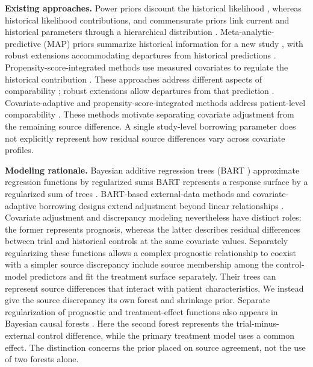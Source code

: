 \documentclass[11pt]{article}
\theoremstyle{remark}\newtheorem{remark}{Remark}[section]
\providecommand{\DIFaddtex}[1]{{\protect\color{blue} \sf #1}} %
\providecommand{\DIFdeltex}[1]{{\protect\color{red} \scriptsize #1}} %
\providecommand{\DIFaddbegin}{} %
\providecommand{\DIFaddend}{} %
\providecommand{\DIFdelbegin}{} %
\providecommand{\DIFdelend}{} %
\providecommand{\DIFadd}[1]{\texorpdfstring{\DIFaddtex{#1}}{#1}} %
\providecommand{\DIFdel}[1]{\texorpdfstring{\DIFdeltex{#1}}{}} %
\begin{document}
\DIFdelbegin %
\DIFdel{\textbf{Existing approaches.}
}\DIFdelend Power priors discount \DIFdelbegin \DIFdel{the historical likelihood , whereas }\DIFdelend \DIFaddbegin \DIFadd{historical likelihood contributions, and }\DIFaddend commensurate priors link current and historical parameters through a hierarchical distribution \citep{IbrahimChen2000,Hobbs2011,Hobbs2012}. Meta-analytic-predictive \DIFdelbegin \DIFdel{(MAP) }\DIFdelend priors summarize historical information for a new study\DIFdelbegin \DIFdel{, with robust extensions accommodating departures from historical predictions \citep{Neuenschwander2010MAP,Schmidli2014MAP}. Propensity-score-integrated methods use measured covariates to regulate the historical contribution \citep{Chen2020PSCL}. These approaches address different aspects of comparability }\DIFdelend \DIFaddbegin \DIFadd{; robust extensions allow departures from that prediction \citep{Neuenschwander2010MAP,Schmidli2014MAP}. Covariate-adaptive and propensity-score-integrated methods address patient-level comparability \citep{Jin2023CAHB,Chen2020PSCL}. These methods motivate separating covariate adjustment from the remaining source difference}\DIFaddend .
\DIFdelbegin \DIFdel{A single study-level borrowing parameter does not explicitly represent how residual source differences vary across covariate profiles.
}\DIFdelend 

\DIFdelbegin %
\DIFdel{\textbf{Modeling rationale.}
Bayesian additive regression trees (BART ) approximate regression functions by regularized sums }\DIFdelend \DIFaddbegin \DIFadd{BART represents a response surface by a regularized sum }\DIFaddend of trees \citep{Chipman2010BART}. \DIFdelbegin \DIFdel{BART-based external-data methods and covariate-adaptive borrowing designs extend adjustment beyond linear relationships \citep{ZhouJi2021,Jin2023CAHB}. Covariate adjustment and discrepancy modeling nevertheless have distinct roles: the former represents prognosis, whereas the latter describes residual differences between trial and historical controls at the same covariate values. Separately regularizing these functions allows a complex prognostic relationship to coexist with a simpler source discrepancy}\DIFdelend \DIFaddbegin \DIFadd{\citet{ZhouJi2021} include source membership among the control-model predictors and fit the treatment surface separately. Their trees can represent source differences that interact with patient characteristics. We instead give the source discrepancy its own forest and shrinkage prior. Separate regularization of prognostic and treatment-effect functions also appears in Bayesian causal forests \citep{Hahn2020BCF}. Here the second forest represents the trial-minus-external control difference, while the primary treatment model uses a common effect. The distinction concerns the prior placed on source agreement, not the use of two forests alone}\DIFaddend .
\end{document}
